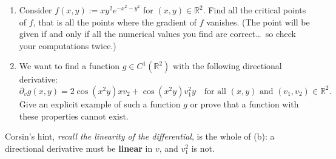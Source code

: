 \begin{exercise}
\label{ex:directional_derivatives_computation}
\begin{enumerate}[label=\textbf{(\alph*)}]
  \item Consider $f(x,y) := xy^2e^{-x^2-y^2}$ for $(x,y) \in \mathbb{R}^2$. Find all the critical
    points of $f$, that is all the points where the gradient of $f$ vanishes. (The point will be
    given if and only if all the numerical values you find are correct\ldots\ so check your
    computations twice.)
  \item We want to find a function $g \in C^1(\mathbb{R}^2)$ with the following directional
    derivative:
    \[\partial_v g(x,y) = 2\cos(x^2y)xv_2 + \cos(x^2y)v_1^2y \quad \text{for all } (x,y) \text{ and } (v_1,v_2) \in \mathbb{R}^2.\]
    Give an explicit example of such a function $g$ or prove that a function with these
    properties cannot exist.
\end{enumerate}
\end{exercise}

\begin{remark}
Corsin's hint, \textit{recall the linearity of the differential}, is the whole of
(b): a directional derivative must be \textbf{linear} in $v$, and $v_1^2$ is not.
\end{remark}


